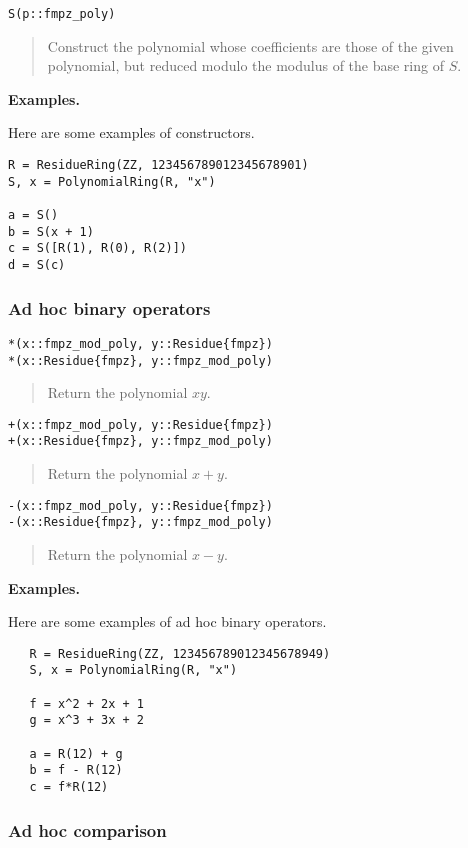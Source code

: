 \documentclass[a4paper,10pt]{article}
\newcommand{\desc}[1]{\vspace{-3mm}\begin{quote}#1\end{quote}}
\begin{document}
{{\begin{lstlisting}
S(p::fmpz_poly)
\end{lstlisting}

\desc{Construct the polynomial whose coefficients are those of the given polynomial, but
reduced modulo the modulus of the base ring of $S$.}

\textbf{Examples.}

Here are some examples of constructors.

\begin{lstlisting}
R = ResidueRing(ZZ, 123456789012345678901)
S, x = PolynomialRing(R, "x")

a = S()
b = S(x + 1)
c = S([R(1), R(0), R(2)])
d = S(c)
\end{lstlisting}

\subsubsection{Ad hoc binary operators}

\begin{lstlisting}
*(x::fmpz_mod_poly, y::Residue{fmpz})
*(x::Residue{fmpz}, y::fmpz_mod_poly)
\end{lstlisting}

\desc{Return the polynomial $xy$.}

\begin{lstlisting}
+(x::fmpz_mod_poly, y::Residue{fmpz})
+(x::Residue{fmpz}, y::fmpz_mod_poly)
\end{lstlisting}

\desc{Return the polynomial $x + y$.}

\begin{lstlisting}
-(x::fmpz_mod_poly, y::Residue{fmpz})
-(x::Residue{fmpz}, y::fmpz_mod_poly)
\end{lstlisting}

\desc{Return the polynomial $x - y$.}

\textbf{Examples.}

Here are some examples of ad hoc binary operators.

\begin{lstlisting}
   R = ResidueRing(ZZ, 123456789012345678949)
   S, x = PolynomialRing(R, "x")

   f = x^2 + 2x + 1
   g = x^3 + 3x + 2

   a = R(12) + g
   b = f - R(12)
   c = f*R(12)
\end{lstlisting}

\subsubsection{Ad hoc comparison}

}}
\end{document}
